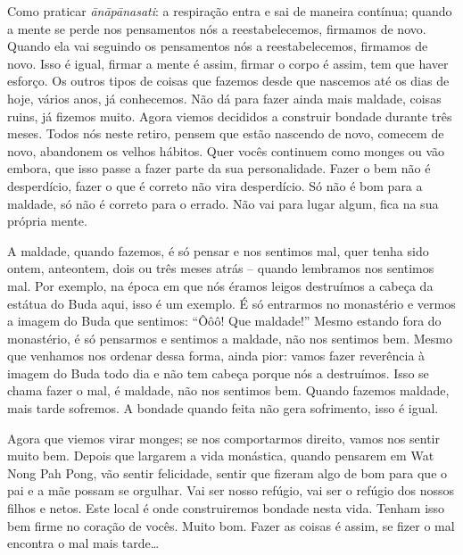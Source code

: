 Como praticar \emph{ānāpānasati}: a respiração entra e sai
de maneira contínua; quando a mente se perde nos pensamentos nós a
reestabelecemos, firmamos de novo. Quando ela vai seguindo os
pensamentos nós a reestabelecemos, firmamos de novo. Isso é igual,
firmar a mente é assim, firmar o corpo é assim, tem que haver esforço.
Os outros tipos de coisas que fazemos desde que nascemos até os dias de
hoje, vários anos, já conhecemos. Não dá para fazer ainda mais maldade,
coisas ruins, já fizemos muito. Agora viemos decididos a construir
bondade durante três meses. Todos nós neste retiro, pensem que estão
nascendo de novo, comecem de novo, abandonem os velhos hábitos. Quer
vocês continuem como monges ou vão embora, que isso passe a fazer parte
da sua personalidade. Fazer o bem não é desperdício, fazer o que é
correto não vira desperdício. Só não é bom para a maldade, só não é
correto para o errado. Não vai para lugar algum, fica na sua própria
mente. 

A maldade, quando fazemos, é só pensar e nos sentimos mal, quer
tenha sido ontem, anteontem, dois ou três meses atrás – quando
lembramos nos sentimos mal. Por exemplo, na época em que nós éramos
leigos destruímos a cabeça da estátua do Buda aqui, isso é um exemplo.
É só entrarmos no monastério e vermos a imagem do Buda que sentimos:
“Ôôô! Que maldade!” Mesmo estando fora do monastério, é só pensarmos e
sentimos a maldade, não nos sentimos bem. Mesmo que venhamos nos
ordenar dessa forma, ainda pior: vamos fazer reverência à imagem do
Buda todo dia e não tem cabeça porque nós a destruímos. Isso se chama
fazer o mal, é maldade, não nos sentimos bem. Quando fazemos maldade,
mais tarde sofremos. A bondade quando feita não gera sofrimento, isso é
igual.

Agora que viemos virar monges; se nos comportarmos direito, vamos
nos sentir muito bem. Depois que largarem a vida monástica, quando
pensarem em Wat Nong Pah Pong, vão sentir felicidade, sentir que
fizeram algo de bom para que o pai e a mãe possam se orgulhar. Vai ser
nosso refúgio, vai ser o refúgio dos nossos filhos e netos. Este local
é onde construiremos bondade nesta vida. Tenham isso bem firme no
coração de vocês. Muito bom. Fazer as coisas é assim, se fizer o mal
encontra o mal mais tarde\ldots{}
